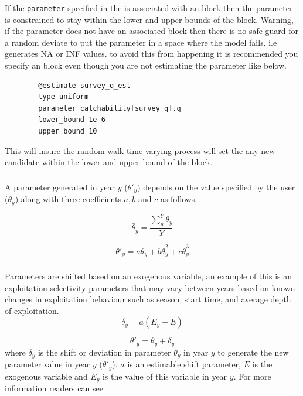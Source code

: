 If the \texttt{parameter} specified in the  is associated with an  block then the parameter is constrained to stay within the lower and upper bounds of the  block. Warning, if the parameter does not have an associated  block then there is no safe guard for a random deviate to put the parameter in a space where the model fails, i.e generates NA or INF values. to avoid this from happening it is recommended you specify an  block even though you are not estimating the parameter like below.

{\small{\begin{verbatim}
		@estimate survey_q_est
		type uniform
		parameter catchability[survey_q].q
		lower_bound 1e-6
		upper_bound 10
		\end{verbatim}}}
This will insure the random walk time varying process will set the any new candidate within the lower and upper bound of the  block.

\subsubsection[Annual shift]{}
A parameter generated in year $y$ ($\theta'_y$) depends on the value specified by the user ($\theta_y$) along with three coefficients $a,b$ and $c$ as follows,

\begin{equation}
\bar{\theta}_y = \frac{\sum_{y}^Y\theta_y}{Y}
\end{equation}

\begin{equation}
\theta'_y = a \bar{\theta}_y + b\bar{\theta}_y^{2} + c\bar{\theta}_y^{3}
\end{equation}

\subsubsection[Exogenous]{}

Parameters are shifted based on an exogenous variable, an example of this is an exploitation selectivity parameters that may vary between years based on known changes in exploitation behaviour such as season, start time, and average depth of exploitation.
\begin{equation}
\delta_y = a(E_y - \bar{E})
\end{equation}

\begin{equation}
\theta'_y = \theta_y + \delta_y
\end{equation}
where $\delta_y$ is the shift or deviation in parameter $\theta_y$ in year $y$ to generate the new parameter value in year $y$ ($\theta'_y$). $a$ is an estimable shift parameter, $E$ is the exogenous variable and $E_y$ is the value of this variable in year $y$. For more information readers can see \cite{francis_03}.

